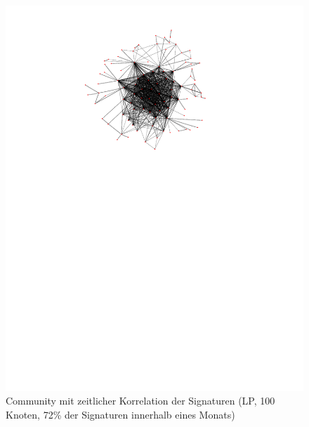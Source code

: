 \begin{figure}[h]
  \centering
  \includegraphics[scale=1.5]{images/subgraph-label-time-fa62cc57cd35e9f90b85435efc407ad5.pdf}
  \caption{Community mit zeitlicher Korrelation der Signaturen (LP,
    100 Knoten, 72\% der Signaturen innerhalb eines Monats)}
  \label{fig:time-corr-com-normal}
\end{figure}


